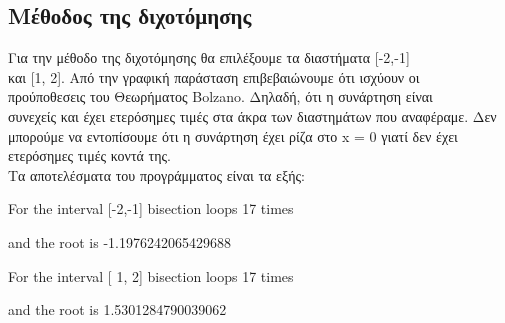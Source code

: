 \documentclass[a4paper,11pt]{article}
\newcommand{\lt}{\latintext}
\newcommand{\gt}{\greektext}
\begin{document}
	\subsection{Μέθοδος της διχοτόμησης}
\normalsize{
Για την μέθοδο της διχοτόμησης θα επιλέξουμε τα διαστήματα [-2,-1] \\ 
και  [1, 2]. Από την γραφική παράσταση επιβεβαιώνουμε ότι ισχύουν οι 
\\ προύποθεσεις του Θεωρήματος \lt Bolzano. \gt Δηλαδή, ότι η
συνάρτηση είναι 
\\ συνεχείς και έχει ετερόσημες τιμές στα άκρα των διαστημάτων που
 αναφέραμε. Δεν
μπορούμε να εντοπίσουμε ότι η συνάρτηση έχει ρίζα στο 
\lt x = 0 \gt γιατί δεν έχει ετερόσημες τιμές κοντά της. 
\\Τα αποτελέσματα του προγράμματος είναι τα εξής: 
\par\lt For the interval [-2,-1] bisection loops 17 times 
\par and the root is -1.1976242065429688
\par For the interval [ 1, 2] bisection loops 17 times 
\par and the root is 1.5301284790039062}
\end{document}
